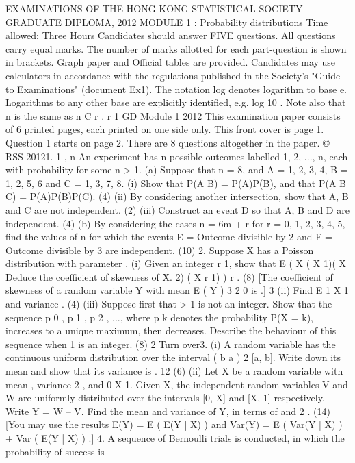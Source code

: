 EXAMINATIONS OF THE HONG KONG STATISTICAL SOCIETY
GRADUATE DIPLOMA, 2012
MODULE 1 : Probability distributions
Time allowed: Three Hours
Candidates should answer FIVE questions.
All questions carry equal marks.
The number of marks allotted for each part-question is shown in brackets.
Graph paper and Official tables are provided.
Candidates may use calculators in accordance with the regulations published in
the Society's "Guide to Examinations" (document Ex1).
The notation log denotes logarithm to base e.
Logarithms to any other base are explicitly identified, e.g. log 10 .
Note also that
n
is the same as n C r .
r
1
GD Module 1 2012
This examination paper consists of 6 printed pages, each printed on one side only.
This front cover is page 1.
Question 1 starts on page 2.
There are 8 questions altogether in the paper.
© RSS 20121.
1
,
n
An experiment has n possible outcomes labelled 1, 2, ..., n, each with probability
for some n > 1.
(a)
Suppose that n = 8, and A = {1, 2, 3, 4}, B = {1, 2, 5, 6} and C = {1, 3, 7, 8}.
(i) Show that P(A
B) = P(A)P(B), and that P(A
B
C) = P(A)P(B)P(C).
(4)
(ii) By considering another intersection, show that A, B and C are not
independent.
(2)
(iii) Construct an event D so that A, B and D are independent.
(4)
(b)
By considering the cases n = 6m + r for r = 0, 1, 2, 3, 4, 5, find the values of n
for which the events
E = {Outcome divisible by 2} and F = {Outcome divisible by 3}
are independent.
(10)
2.
Suppose X has a Poisson distribution with parameter .
(i)
Given an integer r
1, show that E ( X ( X 1)( X
Deduce the coefficient of skewness of X.
2)
( X r 1) )
r
.
(8)
[The coefficient of skewness of a random variable Y with mean
E ( Y
) 3
2
0 is
.]
3
(ii)
Find E
1
X 1
and variance
.
(4)
(iii)
Suppose first that > 1 is not an integer. Show that the sequence p 0 , p 1 , p 2 , ...,
where p k denotes the probability P(X = k), increases to a unique maximum,
then decreases. Describe the behaviour of this sequence when
1 is an
integer.
(8)
2
Turn over3.
(i) A random variable has the continuous uniform distribution over the interval
( b a ) 2
[a, b]. Write down its mean and show that its variance is
.
12
(6)
(ii) Let X be a random variable with mean , variance 2 , and 0 X 1. Given X,
the independent random variables V and W are uniformly distributed over the
intervals [0, X] and [X, 1] respectively. Write Y = W – V. Find the mean and
variance of Y, in terms of and 2 .
(14)
[You may use the results
E(Y) = E ( E(Y | X) ) and Var(Y) = E ( Var(Y | X) ) + Var ( E(Y | X) ) .]
4.
A sequence of Bernoulli trials is conducted, in which the probability of success is
